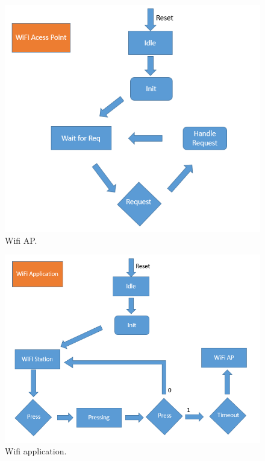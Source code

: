 \documentclass[a4paper,12pt,oneside]{article}
\begin{document}
\begin{itemize}
			\begin{center}
			\begin{figure}[h!]
			\begin{center}
			\includegraphics[scale=.6]{hinh/wifi_ap.PNG}
			\end{center}
			\caption{Wifi AP.}
			\end{figure}
			\end{center}
			
			\begin{center}
			\begin{figure}[h!]
			\begin{center}
			\includegraphics[scale=.6]{hinh/wifi_application.PNG}
			\end{center}
			\caption{Wifi application.}
			\end{figure}
			\end{center}

	\end{itemize}
\end{document}
